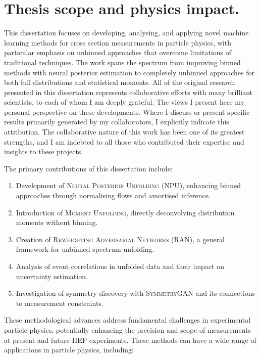 \section{Thesis scope and physics impact.}

This dissertation focuses on developing, analysing, and applying novel machine learning methods for cross section measurements in particle physics, with particular emphasis on unbinned approaches that overcome limitations of traditional techniques. The work spans the spectrum from improving binned methods with neural posterior estimation to completely unbinned approaches for both full distributions and statistical moments.
%
All of the original research presented in this dissertation represents collaborative efforts with many brilliant scientists, to each of whom I am deeply grateful.
%
The views I present here my personal perspective on these developments.
%
Where I discuss or present specific results primarily generated by my collaborators, I explicitly indicate this attribution. The collaborative nature of this work has been one of its greatest strengths, and I am indebted to all those who contributed their expertise and insights to these projects.

The primary contributions of this dissertation include:

\begin{enumerate}
\item Development of \textsc{Neural Posterior Unfolding} (NPU), enhancing binned approaches through normalising flows and amortised inference.
\item Introduction of \textsc{Moment Unfolding}, directly deconvolving distribution moments without binning.
\item Creation of \textsc{Reweighting Adversarial Networks} (RAN), a general framework for unbinned spectrum unfolding.
\item Analysis of event correlations in unfolded data and their impact on uncertainty estimation.
\item Investigation of symmetry discovery with \textsc{SymmetryGAN} and its connections to measurement constraints.
\end{enumerate}

These methodological advances address fundamental challenges in experimental particle physics, potentially enhancing the precision and scope of measurements at present and future HEP experiments.
%
These methods can have a wide range of applications in particle physics, including:

